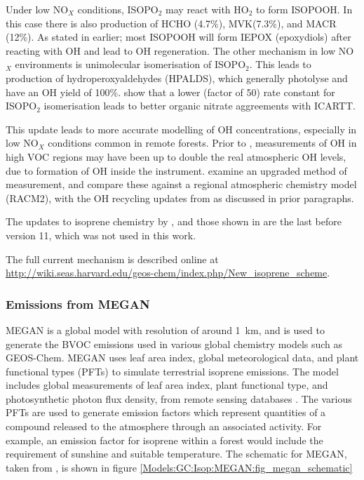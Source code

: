      Under low NO$_X$ conditions, ISOPO$_2$ may react with HO$_2$ to form ISOPOOH.
      In this case there is also production of HCHO (4.7\%), MVK(7.3\%), and MACR (12\%).
      As stated in earlier; most ISOPOOH will form IEPOX (epoxydiols) after reacting with OH and lead to OH regeneration.
      The other mechanism in low NO$_X$ environments is unimolecular isomerisation of ISOPO$_2$.
      This leads to production of hydroperoxyaldehydes (HPALDS), which generally photolyse and have an OH yield of 100\%.
      \textcite{Mao2013} show that a lower (factor of 50) rate constant for ISOPO$_2$ isomerisation leads to better organic nitrate aggreements with ICARTT. 
      
      This update leads to more accurate modelling of OH concentrations, especially in low NO$_X$ conditions common in remote forests.
      Prior to \textcite{Mao2012}, measurements of OH in high VOC regions may have been up to double the real atmospheric OH levels, due to formation of OH inside the instrument.
      \textcite{Mao2012} examine an upgraded method of measurement, and compare these against a regional atmospheric chemistry model (RACM2), with the OH recycling updates from \textcite{Paulot2009b} as discussed in prior paragraphs.
      
      The updates to isoprene chemistry by \textcite{Mao2013}, and those shown in \textcite{Crounse2011,Crounse2012} are the last before version 11, which was not used in this work.
      
      The full current mechanism is described online at \url{http://wiki.seas.harvard.edu/geos-chem/index.php/New_isoprene_scheme}.
  
  
    \subsubsection{Emissions from MEGAN}
      \label{Model:GC:Isop:MEGAN}
  
      MEGAN is a global model with resolution of around 1~km, and is used to generate the BVOC emissions used in various global chemistry models such as GEOS-Chem.
      MEGAN uses leaf area index, global meteorological data, and plant functional types (PFTs) to simulate terrestrial isoprene emissions.
      The model includes global measurements of leaf area index, plant functional type, and photosynthetic photon flux density, from remote sensing databases \parencite{Kefauver2014}.
      The various PFTs are used to generate emission factors which represent quantities of a compound released to the atmosphere through an associated activity.
      For example, an emission factor for isoprene within a forest would include the requirement of sunshine and suitable temperature.
      The schematic for MEGAN, taken from \textcite{Megan_Website}, is shown in figure \ref{Models:GC:Isop:MEGAN:fig_megan_schematic}
      
